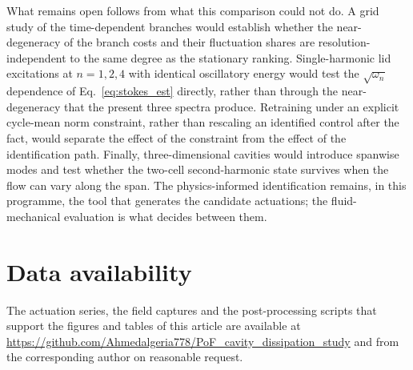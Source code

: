 \documentclass[11pt,a4paper]{article}
\newenvironment{chgadd}{\par\color{blue}}{\par\color{black}}
\newenvironment{chgdel}{\par\color{red}}{\par\color{black}}
\begin{document}
\begin{chgadd}
What remains open follows from what this comparison could not do. A grid study of the
time-dependent branches
would establish whether the near-degeneracy of the branch costs and their
fluctuation shares are resolution-independent to the same degree as the stationary
ranking. Single-harmonic lid excitations at $n=1,2,4$ with identical oscillatory
energy would test the $\sqrt{\omega_n}$ dependence of Eq.~\eqref{eq:stokes_est}
directly, rather than through the near-degeneracy that the present three spectra
produce. Retraining under an explicit
cycle-mean norm constraint, rather than rescaling an identified control after the
fact, would separate the effect of the constraint from the effect of the
identification path. Finally, three-dimensional cavities would introduce spanwise
modes and test whether the two-cell second-harmonic state survives when the flow
can vary along the span. The physics-informed identification remains, in this
programme, the tool that generates the candidate actuations; the fluid-mechanical
evaluation is what decides between them.
\end{chgadd}

\section*{Data availability}

\begin{chgdel}
The actuation series, the field captures and the post-processing scripts that
support the figures and tables of this article are available at
\url{https://github.com/Ahmedalgeria778/PoF_cavity_dissipation_study} and from the
corresponding author on reasonable request.
\end{chgdel}
\end{document}
